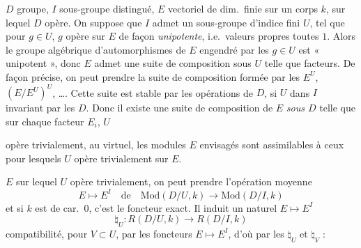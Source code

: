 \documentclass[11pt,a4paper]{article}
\begin{document}
$D$ groupe, $I$ sous-groupe distingué, $E$ vectoriel de dim.\ finie sur un
corps $k$, sur lequel $D$ opère. On suppose que $I$ admet un sous-groupe
d'indice fini $U$,  tel que pour $g \in U$, $g$
opère sur $E$ de façon \emph{unipotente}, i.e.\ valeurs propres toutes $1$.
Alors le groupe algébrique d'automorphismes de $E$ engendré par les
$g \in U$ est « unipotent », donc \struck{\ill{}} $E$ admet une suite de
composition sous $U$ telle que  
facteurs.  De façon précise, on peut prendre la
suite de composition formée par les $E^U$, $(E/E^U)^U$, \ldots. Cette suite
est stable par les opérations de $D$, si 
  $U$ dans $I$ invariant par les $D$. Donc il
existe une suite de composition de $E$ \emph{sous $D$} telle que sur chaque
facteur $E_i$, \struck{\ill{}} $U$

opère trivialement,  \ill{}
\ill{} \ill{} \ill{} au virtuel,  les modules $E$
envisagés sont assimilables à ceux pour lesquels  $U$ opère trivialement sur $E$.

\ill{} \ill{} $E$ sur lequel $U$ opère trivialement, on peut prendre
l'opération moyenne
\[
  E \mapsto E^{I} \quad \text{de} \quad
  \mathrm{Mod}(D/U, k) \to \mathrm{Mod}(D/I, k)
\]
et si $k$ est de car.\ $0$, c'est le  foncteur exact. Il
induit un \ill{} 
\struck{\ill{}} naturel \struck{\ill{}} $E \mapsto E^{I}$
\[
  \natural_U : R(D/U, k) \to R(D/I, k)
\]
 compatibilité, pour $V \subset U$, par les foncteurs
$E \mapsto E^{I}$, d'où par les $\natural_U$ et $\natural_V$ :


\end{document}
